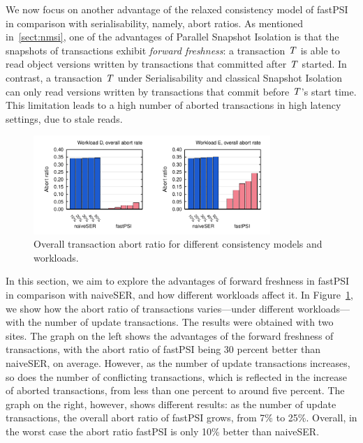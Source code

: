 We now focus on another advantage of the relaxed consistency model of fastPSI in comparison with serialisability, namely, abort ratios. As mentioned in~\ref{sect:nmsi}, one of the advantages of Parallel Snapshot Isolation is that the snapshots of transactions exhibit \emph{forward freshness}: a transaction $\mathit{T}$ is able to read object versions written by transactions that committed after $\mathit{T}$ started. In contrast, a transaction $\mathit{T}$ under Serialisability and classical Snapshot Isolation can only read versions written by transactions that commit before $\mathit{T}$'s start time. This limitation leads to a high number of aborted transactions in high latency settings, due to stale reads.

\begin{figure}[t]
\begin{center}
\includegraphics[width=0.8\textwidth]{figures/abort_rate_bench_overall.pdf}
\vspace{-0.75cm}
\end{center}
\caption{Overall transaction abort ratio for different consistency models and workloads.}
\label{fig:raw_abort_rate_overall}
\end{figure}

In this section, we aim to explore the advantages of forward freshness in fastPSI in comparison with naiveSER, and how different workloads affect it. In Figure~\ref{fig:raw_abort_rate_overall}, we show how the abort ratio of transactions varies---under different workloads---with the number of update transactions. The results were obtained with two sites. The graph on the left shows the advantages of the forward freshness of transactions, with the abort ratio of fastPSI being 30 percent better than naiveSER, on average. However, as the number of update transactions increases, so does the number of conflicting transactions, which is reflected in the increase of aborted transactions, from less than one percent to around five percent. The graph on the right, however, shows different results: as the number of update transactions, the overall abort ratio of fastPSI grows, from 7\% to 25\%. Overall, in the worst case the abort ratio fastPSI is only 10\% better than naiveSER.

